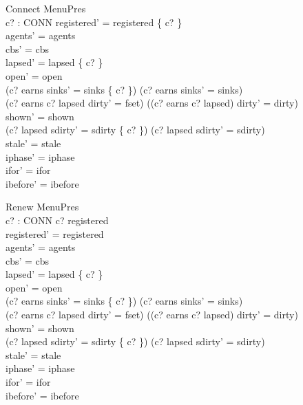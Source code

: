 \documentclass[a4paper,10pt,fleqn]{article}
\begin{document}
\begin{schema}{Connect}
  \Delta MenuPres \\
  c? : CONN
\where
  registered' = registered \cup \{ c? \} \\
  agents' = agents \\
  cbs' = cbs \\
  lapsed' = lapsed \setminus \{ c? \} \\
  open' = open \\
  (c? \in earns \land sinks' = sinks \oplus \{ c?  \}) \lor
    (c? \notin earns \land sinks' = sinks) \\
  (c? \in earns \land c? \in lapsed \land dirty' = fset) \lor
    (\lnot (c? \in earns \land c? \in lapsed) \land dirty' = dirty) \\
  shown' = shown \\
  (c? \in lapsed \land sdirty' = sdirty \cup \{ c? \}) \lor
    (c? \notin lapsed \land sdirty' = sdirty) \\
  stale' = stale \\
  iphase' = iphase \\
  ifor' = ifor \\
  ibefore' = ibefore
\end{schema}

\begin{schema}{Renew}
  \Delta MenuPres \\
  c? : CONN
\where
  c? \in registered \\
  registered' = registered \\
  agents' = agents \\
  cbs' = cbs \\
  lapsed' = lapsed \setminus \{ c? \} \\
  open' = open \\
  (c? \in earns \land sinks' = sinks \oplus \{ c?  \}) \lor
    (c? \notin earns \land sinks' = sinks) \\
  (c? \in earns \land c? \in lapsed \land dirty' = fset) \lor
    (\lnot (c? \in earns \land c? \in lapsed) \land dirty' = dirty) \\
  shown' = shown \\
  (c? \in lapsed \land sdirty' = sdirty \cup \{ c? \}) \lor
    (c? \notin lapsed \land sdirty' = sdirty) \\
  stale' = stale \\
  iphase' = iphase \\
  ifor' = ifor \\
  ibefore' = ibefore
\end{schema}
\end{document}
